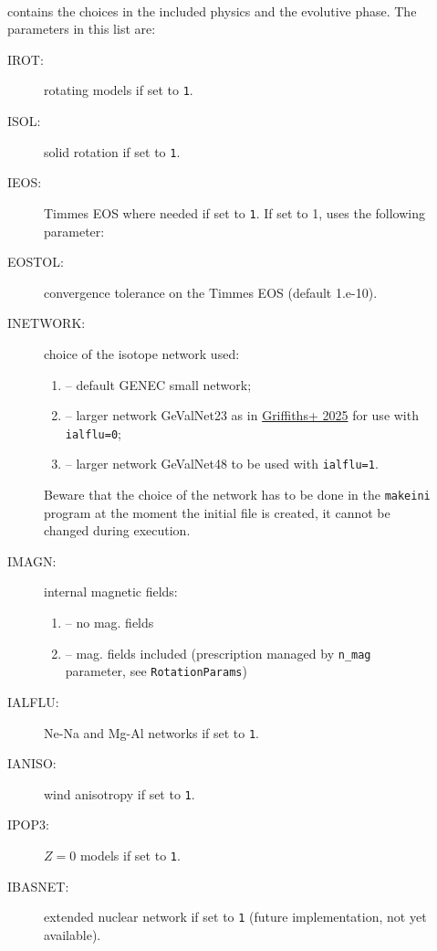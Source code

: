 \documentclass[11pt]{article}
\begin{document}
\begin{description}
  \item[] ~\\ contains the choices in the included physics and the evolutive phase. The parameters in this list are:
    \begin{description}
      \item[IROT:] rotating models if set to \texttt{1}.
      \item[ISOL:] solid rotation if set to \texttt{1}.
      \item[IEOS:] Timmes EOS where needed if set to \texttt{1}. If set to 1, uses the following parameter:
      \item[\hspace*{1cm}EOSTOL:] convergence tolerance on the Timmes EOS (default 1.e-10).
      \item[INETWORK:] choice of the isotope network used:
        \begin{enumerate}[labelindent=.5cm,font=\ttfamily \bfseries,label=\arabic*:]
          \item[0] -- default GENEC small network;
          \item[1] -- larger network GeValNet23 as in \href{https://ui.adsabs.harvard.edu/abs/2024arXiv240803368G}{Griffiths+ 2025} for use with \texttt{ialflu=0};
          \item[2] -- larger network GeValNet48 to be used with \texttt{ialflu=1}.
        \end{enumerate}
        Beware that the choice of the network has to be done in the \texttt{makeini} program at the moment the initial file is created, it cannot be changed during execution.
      \item[IMAGN:] internal magnetic fields:
        \begin{enumerate}[labelindent=.5cm,font=\ttfamily \bfseries,label=\arabic*:]
          \item[0] -- no mag. fields
          \item[1] -- mag. fields included (prescription managed by \verb?n_mag? parameter, see \texttt{RotationParams})
        \end{enumerate}
      \item[IALFLU:] Ne-Na and Mg-Al networks if set to \texttt{1}.
      \item[IANISO:] wind anisotropy if set to \texttt{1}.
      \item[IPOP3:] $Z=0$ models if set to \texttt{1}.
      \item[IBASNET:] extended nuclear network if set to \texttt{1} (future implementation, not yet available).

\end{description}
\end{description}
\end{document}
